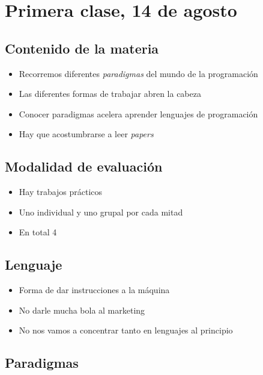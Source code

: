 \section{Primera clase, 14 de agosto}

\subsection{Contenido de la materia}

\begin{itemize}
    \item Recorremos diferentes \textit{paradigmas} del mundo de la programación
    \item Las diferentes formas de trabajar abren la cabeza
    \item Conocer paradigmas acelera aprender lenguajes de programación
    \item Hay que acostumbrarse a leer \textit{papers}
\end{itemize}

\subsection{Modalidad de evaluación}

\begin{itemize}
    \item Hay trabajos prácticos
    \item Uno individual y uno grupal por cada mitad
    \item En total 4
\end{itemize}

\subsection{Lenguaje}

\begin{itemize}
    \item Forma de dar instrucciones a la máquina
    \item No darle mucha bola al marketing
    \item No nos vamos a concentrar tanto en lenguajes al principio
\end{itemize}

\subsection{Paradigmas}

